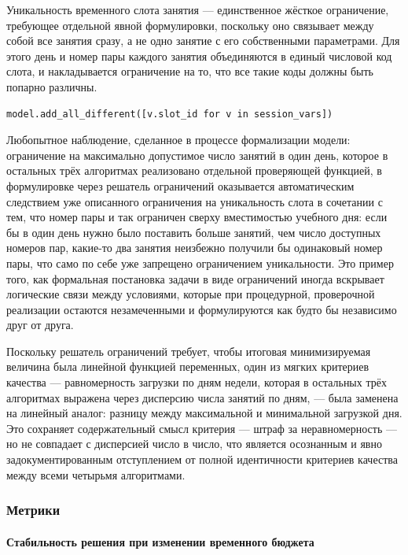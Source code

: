 Уникальность временного слота занятия — единственное жёсткое ограничение, требующее отдельной явной формулировки, поскольку оно связывает между собой все занятия сразу, а не одно занятие с его собственными параметрами. Для этого день и номер пары каждого занятия объединяются в единый числовой код слота, и накладывается ограничение на то, что все такие коды должны быть попарно различны.

\begin{verbatim}
model.add_all_different([v.slot_id for v in session_vars])
\end{verbatim}

Любопытное наблюдение, сделанное в процессе формализации модели: ограничение на максимально допустимое число занятий в один день, которое в остальных трёх алгоритмах реализовано отдельной проверяющей функцией, в формулировке через решатель ограничений оказывается автоматическим следствием уже описанного ограничения на уникальность слота в сочетании с тем, что номер пары и так ограничен сверху вместимостью учебного дня: если бы в один день нужно было поставить больше занятий, чем число доступных номеров пар, какие-то два занятия неизбежно получили бы одинаковый номер пары, что само по себе уже запрещено ограничением уникальности. Это пример того, как формальная постановка задачи в виде ограничений иногда вскрывает логические связи между условиями, которые при процедурной, проверочной реализации остаются незамеченными и формулируются как будто бы независимо друг от друга.

Поскольку решатель ограничений требует, чтобы итоговая минимизируемая величина была линейной функцией переменных, один из мягких критериев качества — равномерность загрузки по дням недели, которая в остальных трёх алгоритмах выражена через дисперсию числа занятий по дням, — была заменена на линейный аналог: разницу между максимальной и минимальной загрузкой дня. Это сохраняет содержательный смысл критерия — штраф за неравномерность — но не совпадает с дисперсией число в число, что является осознанным и явно задокументированным отступлением от полной идентичности критериев качества между всеми четырьмя алгоритмами.

\subsubsection { Метрики}

\paragraph{ Стабильность решения при изменении временного бюджета}

